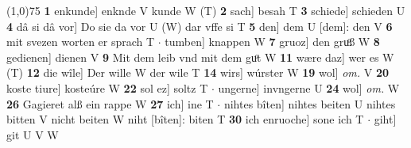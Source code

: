 \documentclass[8pt,a4paper,notitlepage]{article}
\begin{document}
\begin{table}[ht]
\begin{minipage}[t]{0.5\linewidth}
\line(1,0){75} \newline
\textbf{1} enkunde] enknde V kunde W (T) \textbf{2} sach] besah T \textbf{3} schiede] schieden U \textbf{4} dâ si dâ vor] Do sie da vor U (W) dar vffe si T \textbf{5} den] dem U [dem]: den V \textbf{6} mit svezen worten er sprach T  $\cdot$ tumben] knappen W \textbf{7} gruoz] den gruͦß W \textbf{8} gedienen] dienen V \textbf{9} Mit dem leib vnd mit dem guͦt W \textbf{11} wære daz] wer es W (T) \textbf{12} die wîle] Der wille W der wile T \textbf{14} wirs] wúrster W \textbf{19} wol] \textit{om.} V \textbf{20} koste tiure] kosteúre W \textbf{22} sol ez] soltz T  $\cdot$ ungerne] invngerne U \textbf{24} wol] \textit{om.} W \textbf{26} Gagieret alß ein rappe W \textbf{27} ich] ine T  $\cdot$ nihtes bîten] nihtes beiten U nihtes bitten V nicht beiten W niht [bîten]: biten T \textbf{30} ich enruoche] sone ich T  $\cdot$ giht] git U V W \newline
\end{minipage}
\end{table}
\end{document}
